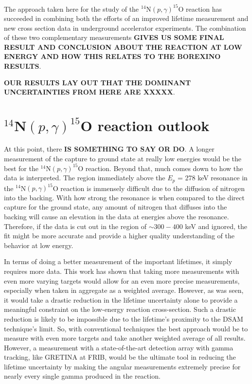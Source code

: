 The approach taken here for the study of the $^{14}$N$(p,\gamma)^{15}$O reaction has succeeded in combining both the efforts of an improved lifetime measurement and new cross section data in underground accelerator experiments. The combination of these two complementary measurements \textbf{GIVES US SOME FINAL RESULT AND CONCLUSION ABOUT THE REACTION AT LOW ENERGY AND HOW THIS RELATES TO THE BOREXINO RESULTS}.

\textbf{OUR RESULTS LAY OUT THAT THE DOMINANT UNCERTAINTIES FROM HERE ARE XXXXX}.


\section{$^{14}$N$\left( p,\gamma \right) ^{15}$O reaction outlook}
\label{sec: outlook}

At this point, there \textbf{IS SOMETHING TO SAY OR DO}. A longer measurement of the capture to ground state at really low energies would be the best for the $^{14}$N$\left( p,\gamma \right) ^{15}$O reaction. Beyond that, much comes down to how the data is interpreted. The region immediately above the $E_{p}$ = 278 keV resonance in the $^{14}$N$\left( p,\gamma \right) ^{15}$O reaction is immensely difficult due to the diffusion of nitrogen into the backing. With how strong the resonance is when compared to the direct capture for the ground state, any amount of nitrogen that diffuses into the backing will cause an elevation in the data at energies above the resonance. Therefore, if the data is cut out in the region of $\sim 300 - 400$ keV and ignored, the fit might be more accurate and provide a higher quality understanding of the behavior at low energy. 

In terms of doing a better measurement of the important lifetimes, it simply requires more data. This work has shown that taking more measurements with even more varying targets would allow for an even more precise measurements, especially when taken in aggregate as a weighted average. However, as was seen, it would take a drastic reduction in the lifetime uncertainty alone to provide a meaningful constraint on the low-energy reaction cross-section. Such a drastic reduction is likely to be impossible due to the lifetime's proximity to the DSAM technique's limit. So, with conventional techniques the best approach would be to measure with even more targets and take another weighted average of all results. However, a measurement with a state-of-the-art detection array with gamma tracking, like GRETINA at FRIB, would be the ultimate tool in reducing the lifetime uncertainty by making the angular measurements extremely precise for nearly every single gamma produced in the reaction. 



%
% 
% 
